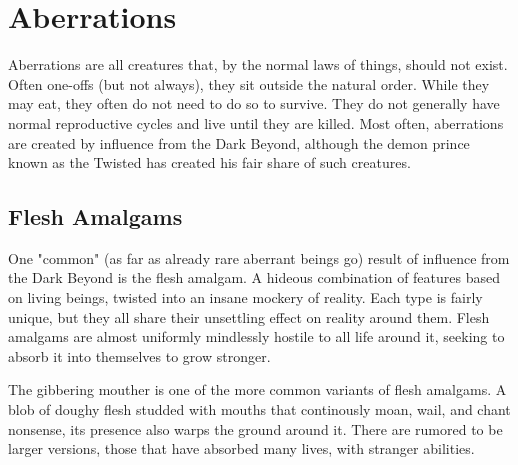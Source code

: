 \clearpage
\section{Aberrations}\label{sec:aberrations}
Aberrations are all creatures that, by the normal laws of things, should not exist. Often one-offs (but not always), they sit outside the natural order. While they may eat, they often do not need to do so to survive. They do not generally have normal reproductive cycles and live until they are killed. Most often, aberrations are created by influence from the Dark Beyond, although the demon prince known as the Twisted has created his fair share of such creatures.

\subsection{Flesh Amalgams}
One "common" (as far as already rare aberrant beings go) result of influence from the Dark Beyond is the flesh amalgam. A hideous combination of features based on living beings, twisted into an insane mockery of reality. Each type is fairly unique, but they all share their unsettling effect on reality around them. Flesh amalgams are almost uniformly mindlessly hostile to all life around it, seeking to absorb it into themselves to grow stronger.

The gibbering mouther is one of the more common variants of flesh amalgams. A blob of doughy flesh studded with mouths that continously moan, wail, and chant nonsense, its presence also warps the ground around it. There are rumored to be larger versions, those that have absorbed many lives, with stranger abilities.


